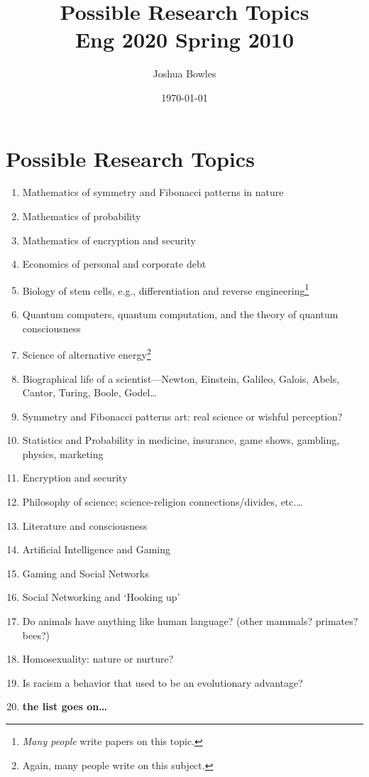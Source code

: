 \documentclass[11pt]{article}
\author{Joshua Bowles}
\title{Possible Research Topics\\
\small Eng 2020 Spring 2010}
\date{\today}
\begin{document}
\maketitle


\section{Possible Research Topics}
\begin{enumerate}
\item Mathematics of symmetry and Fibonacci patterns in nature
\item Mathematics of probability
\item Mathematics of encryption and security
\item Economics of personal and corporate debt
\item Biology of stem cells, e.g., differentiation and reverse engineering\footnote{\emph{Many people} write papers on this topic.}
\item Quantum computers, quantum computation, and the theory of quantum consciousness
\item Science of alternative energy\footnote{Again, many people write on this subject.}
\item Biographical life of a scientist---Newton, Einstein, Galileo, Galois, Abels, Cantor, Turing, Boole, Godel\ldots{}
\item Symmetry and Fibonacci patterns art: real science or wishful perception?
\item Statistics and Probability in medicine, insurance, game shows, gambling, physics, marketing
\item Encryption and security
\item Philosophy of science; science-religion connections/divides, etc.\ldots
\item Literature and consciousness
\item Artificial Intelligence and Gaming
\item Gaming and Social Networks
\item Social Networking and `Hooking up'
\item Do animals have anything like human language? (other mammals? primates? bees?)
\item Homosexuality: nature or nurture?
\item Is racism a behavior that used to be an evolutionary advantage?
\item {\bf the list goes on\ldots}
\end{enumerate}
\end{document}
